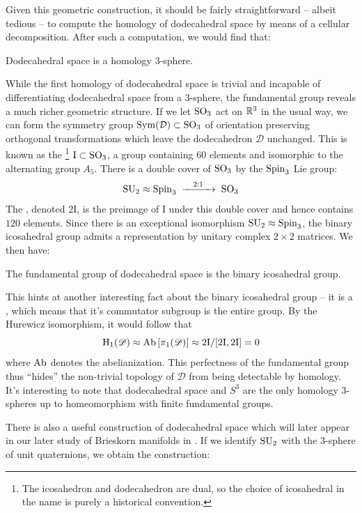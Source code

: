 Given this geometric construction, it should be fairly straightforward -- albeit tedious -- to compute the homology of dodecahedral space by means of a cellular decomposition. After such a computation, we would find that:
\begin{proposition}
	Dodecahedral space is a homology $3$-sphere.
\end{proposition}

While the first homology of dodecahedral space is trivial and incapable of differentiating dodecahedral space from a 3-sphere, the fundamental group reveals a much richer geometric structure. If we let ${\operatorname{SO}}_3$ act on $\mathbb{R}^3$ in the usual way, we can form the symmetry group $\operatorname{\operatorname{Sym}}(\mathcal{D})\subset {\operatorname{SO}}_3$ of orientation preserving orthogonal transformations which leave the dodecahedron $\mathcal{D}$ unchanged. This is known as the \footnote{The icosahedron and dodecahedron are dual, so the choice of icosahedral in the name is purely a historical convention.} $\mathrm{I}\subset {\operatorname{SO}}_3$, a group containing $60$ elements and isomorphic to the alternating group $A_5$. There is a double cover of ${\operatorname{SO}}_3$ by the ${\operatorname{Spin}}_3$ Lie group:
\[
	\SU_2\cong \Spin_3\lkxto[2:1] \SO_3
\]
The , denoted $2\mathrm{I}$, is the preimage of $\mathrm{I}$ under this double cover and hence contains $120$ elements. Since there is an exceptional isomorphism ${\operatorname{SU}}_2\approx {\operatorname{Spin}}_3$, the binary icosahedral group admits a representation by unitary complex $2\times 2$ matrices.
We then have:
\begin{proposition}
	The fundamental group of dodecahedral space is the binary icosahedral group.
\end{proposition}
This hints at another interesting fact about the binary icosahedral group -- it is a , which means that it's commutator subgroup is the entire group. By the Hurewicz isomorphism, it would follow that
\[
	\operatorname{H}_1(\mathscr{D}) \approx \operatorname{\operatorname{Ab}}\left[ \pi_1(\mathscr{D})\right] \approx 2\mathrm{I}/[2\mathrm{I}, 2\mathrm{I}] = 0
\]
where $\operatorname{\operatorname{Ab}}$ denotes the abelianization. This perfectness of the fundamental group thus ``hides'' the non-trivial topology of $\mathscr{D}$ from being detectable by homology. It's interesting to note that dodecahedral space and $S^3$ are the only homology $3$-spheres up to homeomorphism with finite fundamental groups.

There is also a useful construction of dodecahedral space which will later appear in our later study of Brieskorn manifolds in . If we identify ${\operatorname{SU}}_2$ with the $3$-sphere of unit quaternions, we obtain the construction:

